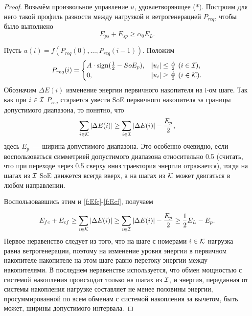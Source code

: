 \begin{proof}
Возьмём произвольное управление $u$, удовлетворяющее (*).
Построим для него такой профиль разности между нагрузкой и ветрогенерацией $P_{req}$, чтобы было выполнено \begin{equation}
\label{f:a_0}
    E_{ps} + E_{sp} \geq \alpha_0 E_{L}.
\end{equation}

Пусть $u(i) = f(P_{req}(0), \ldots, P_{req}(i-1))$. 
Положим $$
P_{req}(i) = \begin{cases}
A\cdot \operatorname{sign}(\frac{1}{2} - SoE_{p}), &|u_i| \leq \frac{A}{2}~ (i \in \mathcal{I}),\\
0, &|u_i| \geq \frac{A}{2}~ (i \in \mathcal{K}).
\end{cases}
$$
Обозначим $\Delta E(i)$ изменение энергии первичного накопителя на i-ом шаге.
Так как при $i \in \mathcal{I}$ $P_{req}$ старается увести SoE первичного накопителя за границы допустимого диапазона, то понятно, что
$$\sum_{i \in \mathcal{K}}{|\Delta E(i)|} \geq \sum_{i \in \mathcal{I}}{|\Delta E(i)|} -\frac{E_{p}}{2} ,$$
здесь $E_p$~--- ширина допустимого диапазона.
Это особенно очевидно, если воспользоваться симметрией допустимого диапазона относительно 0.5 (считать, что при переходе через 0.5 сверху вниз траектория энергии отражается), тогда на шагах из $\mathcal{I}$ SoE движется всегда вверх, а на шагах из $\mathcal{K}$ может двигаться в любом направлении.

Воспользовавшись этим и \ref{f:Efc}-\ref{f:Ecf}, получаем

$$
E_{fc} + E_{cf} %
\geq \sum_{i \in \K}{|\Delta E(i)|} \geq 
\sum_{i \in \I}{|\Delta E(i)|} -  \frac{E_{p}}{2} \geq
\frac{1}{2} E_{L} - E_{p}.
$$
Первое неравенство следует из того, что на шаге с номерами $i \in \mathcal{K}$ нагрузка равна ветрогенерации, поэтому на изменение уровня энергии в первичном накопителе накопителе на этом шаге равно перетоку энергии между накопителями.
В последнем неравенстве используется, что обмен мощностью с системой накопления происходит только на шагах из $\mathcal{I}$, и энергия, переданная от системы накопления нагрузке составляет не менее половины энергии, просуммированной по всем обменам с системой накопления за вычетом, быть может, ширины допустимого интервала.





\end{proof}
